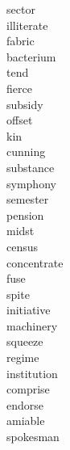 \documentclass[b5paper, 11pt]{ctexart}
\begin{document}
\begin{multicols*}{3}
\begin{description}
\item[sector]

\item[illiterate]

\item[fabric]

\item[bacterium]

\item[tend]

\item[fierce]

\item[subsidy]

\item[offset]

\item[kin]

\item[cunning]

\item[substance]

\item[symphony]

\item[semester]

\item[pension]

\item[midst]

\item[census]

\item[concentrate]

\item[fuse]

\item[spite]

\item[initiative]

\item[machinery]

\item[squeeze]

\item[regime]

\item[institution]

\item[comprise]

\item[endorse]

\item[amiable]

\item[spokesman]


\end{description}
\end{multicols*}
\end{document}
